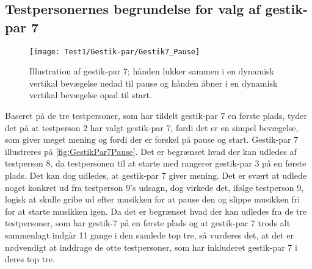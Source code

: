 \subsection{Testpersonernes begrundelse for valg af gestik-par 7}
\label{TestresultaterValgAfGestikkerBegrundelseGP7}
%
\begin{figure}[H]
	\centering
	\texttt{[image: Test1/Gestik-par/Gestik7\_Pause]}
	\caption{Illustration af gestik-par 7; hånden lukker sammen i en dynamisk vertikal bevægelse nedad til pause og hånden åbner i en dynamisk vertikal bevægelse opad til start.}
	\label{fig:GestikPar7Pause}
\end{figure}
\noindent
%
Baseret på de tre testpersoner, som har tildelt gestik-par 7 en første plads, tyder det på at testperson 2 har valgt gestik-par 7, fordi det er en simpel bevægelse, som giver meget mening og fordi der er forskel på pause og start. Gestik-par 7 illustreres på \autoref{fig:GestikPar7Pause}. Det er begrænset hvad der kan udledes af testperson 8, da testpersonen til at starte med rangerer gestik-par 3 på en første plads. Det kan dog udledes, at gestik-par 7 giver mening. Det er svært at udlede noget konkret ud fra testperson 9's udsagn, dog virkede det, ifølge testperson 9, logisk at skulle gribe ud efter musikken for at pause den og slippe musikken fri for at starte musikken igen. Da det er begrænset hvad der kan udledes fra de tre testpersoner, som har gestik-7 på en første plads og at gestik-par 7 trods alt sammenlagt indgår 11 gange i den samlede top tre, så vurderes det, at det er nødvendigt at inddrage de otte testpersoner, som har inkluderet gestik-par 7 i deres top tre. 

